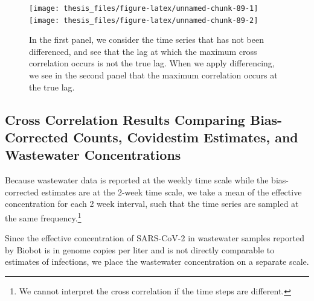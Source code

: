 \documentclass[12pt,twoside]{smiththesis}
\begin{document}
~

~

~

~

~
\begin{figure}
\texttt{[image: thesis\_files/figure-latex/unnamed-chunk-89-1]} \texttt{[image: thesis\_files/figure-latex/unnamed-chunk-89-2]} \caption{\label{fig:corzy}In the first panel, we consider the time series that has not been differenced, and see that the lag at which the maximum cross correlation occurs is not the true lag. When we apply differencing, we see in the second panel that the maximum correlation occurs at the true lag.}\label{fig:unnamed-chunk-89}
\end{figure}
\hypertarget{cross-correlation-results-comparing-bias-corrected-counts-covidestim-estimates-and-wastewater-concentrations}{%
\subsection{Cross Correlation Results Comparing Bias-Corrected Counts, Covidestim Estimates, and Wastewater Concentrations}\label{cross-correlation-results-comparing-bias-corrected-counts-covidestim-estimates-and-wastewater-concentrations}}

Because wastewater data is reported at the weekly time scale while the bias-corrected estimates are at the 2-week time scale, we take a mean of the effective concentration for each 2 week interval, such that the time series are sampled at the same frequency.\footnote{We cannot interpret the cross correlation if the time steps are different.}

Since the effective concentration of SARS-CoV-2 in wastewater samples reported by Biobot is in genome copies per liter and is not directly comparable to estimates of infections, we place the wastewater concentration on a separate scale.
\end{document}
